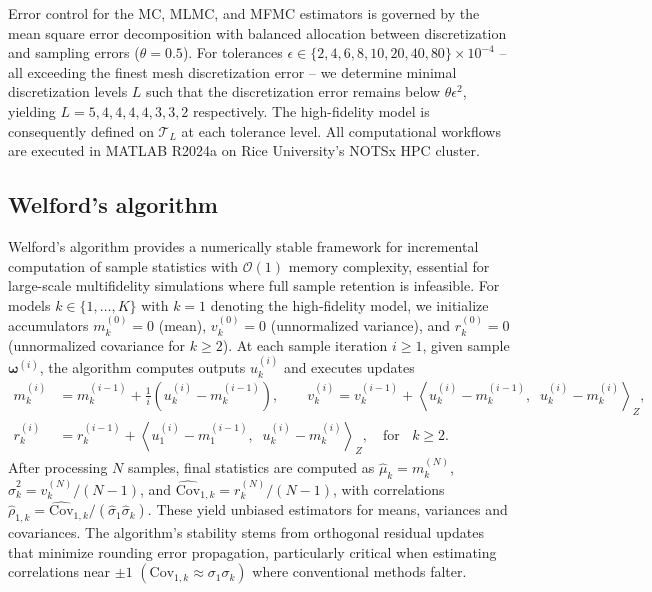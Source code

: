 Error control for the MC, MLMC, and MFMC estimators is governed by the mean square error decomposition with balanced allocation between discretization and sampling errors ($\theta = 0.5$). For tolerances $\epsilon \in \{2,4,6,8,10,20,40,80\} \times 10^{-4}$ -- all exceeding the finest mesh discretization error -- we determine minimal discretization levels $L$ such that the discretization error remains below $\theta \epsilon^2$, yielding $L = 5,4,4,4,4,3,3,2 $ respectively. The high-fidelity model is consequently defined on $\mathcal{T}_L$ at each tolerance level. All computational workflows are executed in MATLAB R2024a on Rice University's NOTSx HPC cluster.






\subsection{Welford's algorithm}
Welford's algorithm \cite{Welford:1962} provides a numerically stable framework for incremental computation of sample statistics with $\mathcal{O}(1)$ memory complexity, essential for large-scale multifidelity simulations where full sample retention is infeasible. For models $k \in \{1, \dots, K\}$ with $k=1$ denoting the high-fidelity model, we initialize accumulators $m_k^{(0)} = 0$ (mean), $v_k^{(0)} = 0$ (unnormalized variance), and $r_k^{(0)} = 0$ (unnormalized covariance for $k \geq 2$). At each sample iteration $i \geq 1$, given sample $\boldsymbol{\omega}^{(i)}$, the algorithm computes outputs $u_k^{(i)}$ and executes updates
%
\begin{align*}
    m_k^{(i)} &= m_k^{(i-1)} + \frac{1}{i}\left( u_{k}^{(i)}-m_k^{(i-1)}\right),\qquad v_k^{(i)} = v_k^{(i-1)} + \left\langle  u_{k}^{(i)}-m_k^{(i-1)}, \;\; u_{k}^{(i)}-m_k^{(i)}\right\rangle_Z,\\
    r_k^{(i)} &= r_k^{(i-1)} + \left \langle  u_{1}^{(i)}-m_{1}^{(i-1)},\;\; u_{k}^{(i)}- m_{k}^{(i)}\right\rangle_Z, \quad \text{for }\;\; k\ge 2.
\end{align*}
%
After processing $N$ samples, final statistics are computed as $\widehat{\mu}_k = m_k^{(N)}$, $\widehat{\sigma}_k^2 = v_k^{(N)}/(N-1)$, and $\widehat{\text{Cov}}_{1,k} = r_k^{(N)}/(N-1)$, with correlations $\widehat{\rho}_{1,k} = \widehat{\text{Cov}}_{1,k}/(\widehat{\sigma}_1 \widehat{\sigma}_k)$. These yield unbiased estimators for means, variances and covariances. The algorithm's stability stems from orthogonal residual updates that minimize rounding error propagation, particularly critical when estimating correlations near $\pm 1$ $(\text{Cov}_{1,k}\approx \sigma_1\sigma_k)$ where conventional methods falter.

